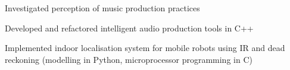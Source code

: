 \documentclass[letterpaper]{deedy-resume} %
\begin{document}
{\begin{minipage}[t]{0.66\textwidth}



\hspace{-0.1cm}
\begin{tightitemize}
\item Investigated perception of music production practices
\item Developed and refactored intelligent audio production tools in C++
\end{tightitemize}


\hspace{-0.1cm} 
\begin{tightitemize}
\item Implemented indoor localisation system for mobile robots using IR and dead reckoning (modelling in Python, microprocessor programming in C)
\end{tightitemize}




\end{minipage}}
\end{document}
